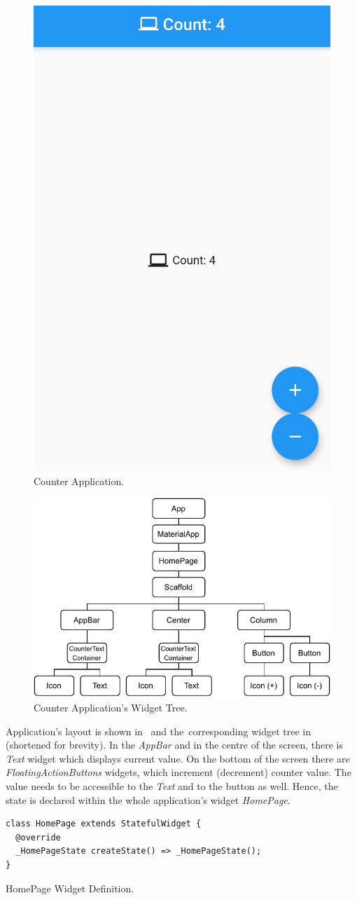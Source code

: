 \begin{figure}[htp]
    \centering
    \includegraphics[width=0.33\linewidth]{img/flutter/counter_app_base.png}
    \caption{Counter Application.}
    \label{fig:counter-app}
\end{figure}

\begin{figure}[htp]
    \centering
    \includegraphics[width=0.75\linewidth]{img/flutter/counter-base.pdf}
    \caption{Counter Application's Widget Tree.}
    \label{fig:counter-app-widget-tree}
\end{figure}

Application's layout is shown in~ and the~corresponding widget tree in~ (shortened for brevity). In the \textit{AppBar} and in the centre of the screen, there is \textit{Text} widget which displays current value. On the bottom of the screen there are \textit{FloatingActionButtons} widgets, which increment (decrement) counter value. The value needs to be accessible to the \textit{Text} and to the button as well. Hence, the state is declared within the whole application's widget \textit{HomePage}.  

\begin{listing}[ht]
\begin{verbatim}
class HomePage extends StatefulWidget {
  @override
  _HomePageState createState() => _HomePageState();
}
\end{verbatim}
\caption{HomePage Widget Definition.}
\label{listing:counter-homepage-widget}
\end{listing}

